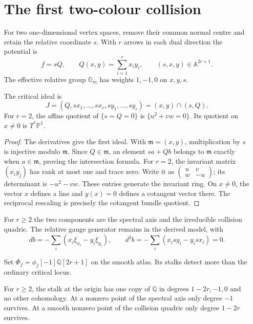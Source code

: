 \section{The first two-colour collision}
\label{cycompact:sec:two-colour}

For two one-dimensional vertex spaces, remove their common
normal centre and retain the relative coordinate $s$.
With $r$ arrows in each dual direction the potential is
\[
 f=sQ,\qquad Q(x,y)=\sum_{i=1}^r x_iy_i,
 \qquad (s,x,y)\in\mathbb A^{2r+1}.
\]
The effective relative group $\mathbb G_m$ has weights
$1,-1,0$ on $x,y,s$.

\begin{proposition}\label{cycompact:prop:collision}
The critical ideal is
\begin{equation}\label{cycompact:eq:collision-ideal}
 J=(Q,sx_1,\ldots,sx_r,sy_1,\ldots,sy_r)
   =(x,y)\cap(s,Q).
\end{equation}
For $r=2$, the affine quotient of $\{s=Q=0\}$ is
$\{u^2+vw=0\}$. Its quotient on $x\ne0$ is
$T^*\mathbb P^1$.
\end{proposition}

\begin{proof}
The derivatives give the first ideal. With
$\mathfrak m=(x,y)$, multiplication by $s$ is injective
modulo $\mathfrak m$. Since $Q\in\mathfrak m$, an element
$sa+Qb$ belongs to $\mathfrak m$ exactly when
$a\in\mathfrak m$, proving the intersection formula.
For $r=2$, the invariant matrix $(x_iy_j)$ has rank at
most one and trace zero. Write it as
$\left(\begin{smallmatrix}u&v\\w&-u\end{smallmatrix}\right)$;
its determinant is $-u^2-vw$. These entries generate
the invariant ring. On $x\ne0$, the vector $x$ defines
a line and $y(x)=0$ defines a cotangent vector there.
The reciprocal rescaling is precisely the cotangent
bundle quotient.
\end{proof}

For $r\geq2$ the two components are the spectral axis
and the irreducible collision quadric. The relative
gauge generator remains in the derived model, with
\[
 db=-\sum_i(x_i\xi_{x_i}-y_i\xi_{y_i}),
 \qquad d^2b=-\sum_i(x_isy_i-y_isx_i)=0.
\]

Set $\Phi_f=\phi_f[-1]\mathbb Q[2r+1]$ on the smooth
atlas. Its stalks detect more than the ordinary critical
locus.

\begin{proposition}\label{cycompact:prop:milnor}
For $r\geq2$, the stalk at the origin has one copy of
$\mathbb Q$ in degrees $1-2r,-1,0$ and no other
cohomology. At a nonzero point of the spectral axis
only degree $-1$ survives. At a smooth nonzero point
of the collision quadric only degree $1-2r$ survives.
\end{proposition}

